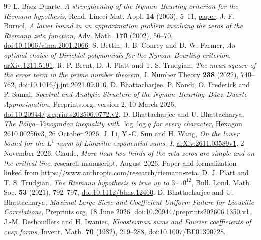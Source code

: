 \documentclass[11pt]{amsart}
\theoremstyle{definition}
\theoremstyle{remark}
\numberwithin{equation}{section}
\begin{document}
\begingroup
\raggedright
\begin{thebibliography}{99}
 L. B\'aez-Duarte, \emph{A strengthening of the Nyman--Beurling criterion for the Riemann hypothesis}, Rend. Lincei Mat. Appl. \textbf{14} (2003), 5--11, \href{https://www.bdim.eu/item?fmt=pdf&id=RLIN_2003_9_14_1_5_0}{paper}.
 J.-F. Burnol, \emph{A lower bound in an approximation problem involving the zeros of the Riemann zeta function}, Adv. Math. \textbf{170} (2002), 56--70, \href{https://doi.org/10.1006/aima.2001.2066}{doi:10.1006/aima.2001.2066}.
 S. Bettin, J. B. Conrey and D. W. Farmer, \emph{An optimal choice of Dirichlet polynomials for the Nyman--Beurling criterion}, \href{https://arxiv.org/abs/1211.5191}{arXiv:1211.5191}.
 R. P. Brent, D. J. Platt and T. S. Trudgian, \emph{The mean square of the error term in the prime number theorem}, J. Number Theory \textbf{238} (2022), 740--762, \href{https://doi.org/10.1016/j.jnt.2021.09.016}{doi:10.1016/j.jnt.2021.09.016}.
 D. Bhattacharjee, P. Nandi, O. Frederick and P. Samal, \emph{Spectral and Analytic Structure of the Nyman--Beurling--B\'aez--Duarte Approximation}, Preprints.org, version 2, 10 March 2026, \href{https://doi.org/10.20944/preprints202506.0772.v2}{doi:10.20944/preprints202506.0772.v2}.
 D. Bhattacharjee and U. Bhattacharya, \emph{The P\'olya--Vinogradov inequality with \(\log\log q\) for every character}, \href{https://hexagonmath.org/2610.00256v3}{Hexagon 2610.00256v3}, 26 October 2026.
 J. Li, Y.-C. Sun and H. Wang, \emph{On the lower bound for the \(L^1\) norm of Liouville exponential sums. I}, \href{https://arxiv.org/abs/2611.03589v1}{arXiv:2611.03589v1}, 2 November 2026.
 Claude, \emph{More than two thirds of the zeta zeros are simple and on the critical line}, research manuscript, August 2026. Paper and formalization linked from \url{https://www.anthropic.com/research/riemann-zeta}.
 D. J. Platt and T. S. Trudgian, \emph{The Riemann hypothesis is true up to \(3\cdot10^{12}\)}, Bull. Lond. Math. Soc. \textbf{53} (2021), 792--797, \href{https://doi.org/10.1112/blms.12460}{doi:10.1112/blms.12460}.
 D. Bhattacharjee and U. Bhattacharya, \emph{Maximal Large Sieve and Coefficient Uniform Failure for Liouville Correlations}, Preprints.org, 18 June 2026. \href{https://doi.org/10.20944/preprints202606.1350.v1}{doi:10.20944/preprints202606.1350.v1}.
 J.-M. Deshouillers and H. Iwaniec, \emph{Kloosterman sums and Fourier coefficients of cusp forms}, Invent. Math. \textbf{70} (1982), 219--288, \href{https://doi.org/10.1007/BF01390728}{doi:10.1007/BF01390728}.

\end{thebibliography}
\end{document}
